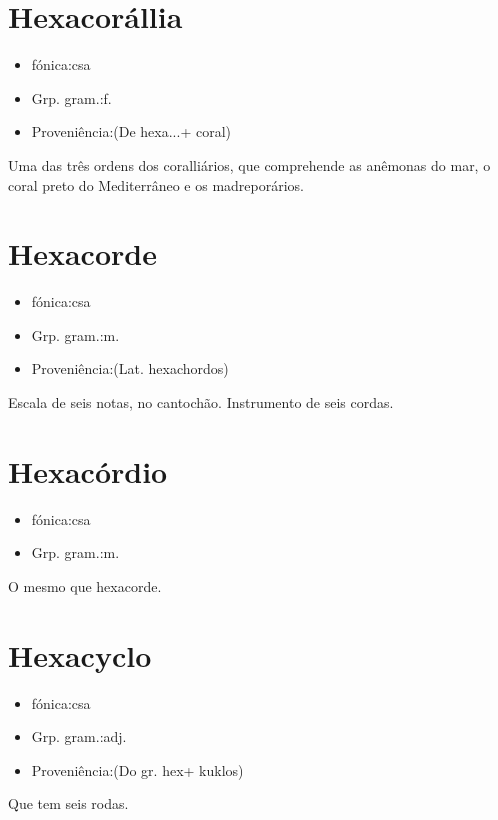 \documentclass{article}
\begin{document}
\section{Hexacorállia}
\begin{itemize}
\item {fónica:csa}
\end{itemize}
\begin{itemize}
\item {Grp. gram.:f.}
\end{itemize}
\begin{itemize}
\item {Proveniência:(De \textunderscore hexa...\textunderscore  + \textunderscore coral\textunderscore )}
\end{itemize}
Uma das três ordens dos coralliários, que comprehende as anêmonas do mar, o coral preto do Mediterrâneo e os madreporários.
\section{Hexacorde}
\begin{itemize}
\item {fónica:csa}
\end{itemize}
\begin{itemize}
\item {Grp. gram.:m.}
\end{itemize}
\begin{itemize}
\item {Proveniência:(Lat. \textunderscore hexachordos\textunderscore )}
\end{itemize}
Escala de seis notas, no cantochão.
Instrumento de seis cordas.
\section{Hexacórdio}
\begin{itemize}
\item {fónica:csa}
\end{itemize}
\begin{itemize}
\item {Grp. gram.:m.}
\end{itemize}
O mesmo que \textunderscore hexacorde\textunderscore .
\section{Hexacyclo}
\begin{itemize}
\item {fónica:csa}
\end{itemize}
\begin{itemize}
\item {Grp. gram.:adj.}
\end{itemize}
\begin{itemize}
\item {Proveniência:(Do gr. \textunderscore hex\textunderscore  + \textunderscore kuklos\textunderscore )}
\end{itemize}
Que tem seis rodas.
\end{document}
